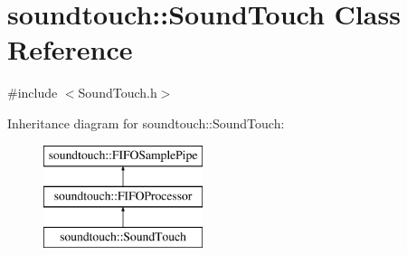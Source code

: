 \hypertarget{classsoundtouch_1_1_sound_touch}{}\section{soundtouch\+:\+:Sound\+Touch Class Reference}
\label{classsoundtouch_1_1_sound_touch}


{\ttfamily \#include $<$Sound\+Touch.\+h$>$}

Inheritance diagram for soundtouch\+:\+:Sound\+Touch\+:\begin{figure}[H]
\begin{center}
\leavevmode
\includegraphics[height=3.000000cm]{classsoundtouch_1_1_sound_touch}
\end{center}
\end{figure}
